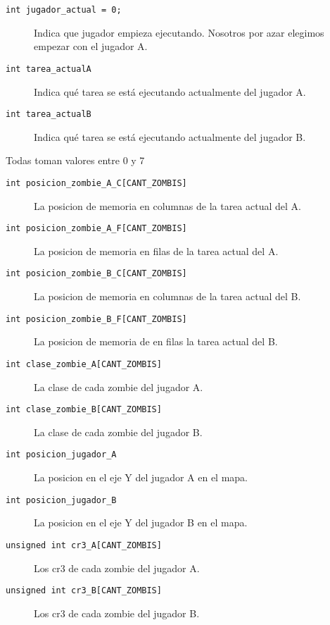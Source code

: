 \documentclass[a4paper]{article}
\begin{document}
\begin{description}
	\item[\texttt{int jugador_actual = 0;}] Indica que jugador empieza ejecutando. Nosotros por azar elegimos empezar con el jugador A.
	\item[\texttt{int tarea_actualA}] Indica qué tarea se está ejecutando actualmente del jugador A.
	\item[\texttt{int tarea_actualB}] Indica qué tarea se está ejecutando actualmente del jugador B.
\end{description}	
Todas toman valores entre 0 y 7
\begin{description}
	\item[\texttt{int posicion_zombie_A_C[CANT_ZOMBIS]}] La posicion de memoria en columnas de la tarea actual del A.
	\item[\texttt{int posicion_zombie_A_F[CANT_ZOMBIS]}] La posicion de memoria en filas de la tarea actual del A.
	\item[\texttt{int posicion_zombie_B_C[CANT_ZOMBIS]}] La posicion de memoria en columnas de la tarea actual del B.
	\item[\texttt{int posicion_zombie_B_F[CANT_ZOMBIS]}] La posicion de memoria de en filas la tarea actual del B.
	\item[\texttt{int clase_zombie_A[CANT_ZOMBIS]}] La clase de cada zombie del jugador A.
	\item[\texttt{int clase_zombie_B[CANT_ZOMBIS]}] La clase de cada zombie del jugador B.
	\item[\texttt{int posicion_jugador_A}] La posicion en el eje Y del jugador A en el mapa.
	\item[\texttt{int posicion_jugador_B}] La posicion en el eje Y del jugador B en el mapa.
	\item[\texttt{unsigned int cr3_A[CANT_ZOMBIS]}] Los cr3 de cada zombie del jugador A.
	\item[\texttt{unsigned int cr3_B[CANT_ZOMBIS]}] Los cr3 de cada zombie del jugador B.
\end{description}
\end{document}
